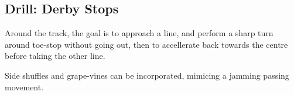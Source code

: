 \subsection*{Drill: Derby Stops}
\label{drill:stopping/derby_stops}

Around the track, the goal is to approach a line, and perform a sharp turn around toe-stop without going out, then to accellerate back towards the centre before taking the other line.

Side shuffles and grape-vines can be incorporated, mimicing a jamming passing movement.

